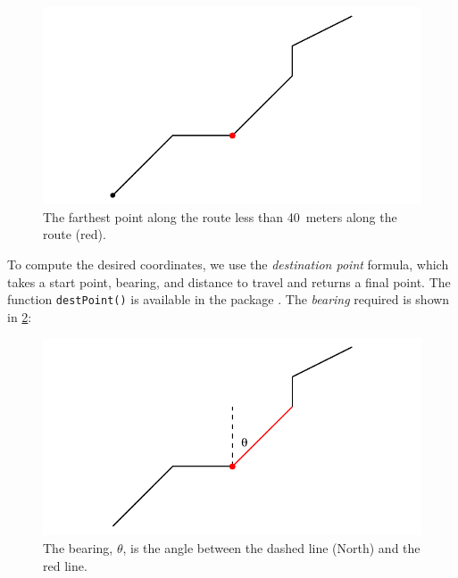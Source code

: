 \begin{knitrout}\small
{}\color{fgcolor}\begin{figure}[ht]

{\centering \includegraphics[width=.6\textwidth]{figure/app:measure_step1-1} 

}

\caption[The farthest point along the route less than 40~meters along the route (red)]{The farthest point along the route less than 40~meters along the route (red).}\label{fig:app:measure_step1}
\end{figure}


\end{knitrout}

To compute the desired coordinates, we use the \emph{destination point} formula, which takes a start point, bearing, and distance to travel and returns a final point. The function \verb+destPoint()+ is available in the  package \citep{geosphere}. The \emph{bearing} required is shown in \cref{fig:app:measure_step2}:

\begin{knitrout}\small
{}\color{fgcolor}\begin{figure}[h]

{\centering \includegraphics[width=.6\textwidth]{figure/app:measure_step2-1} 

}

\caption[The bearing, $\theta$, is the angle between the dashed line (North) and the red line]{The bearing, $\theta$, is the angle between the dashed line (North) and the red line.}\label{fig:app:measure_step2}
\end{figure}


\end{knitrout}

